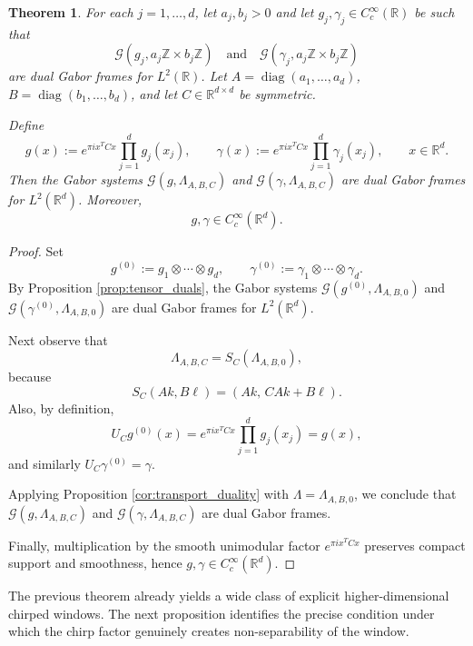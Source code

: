 \documentclass[final,1p,times,authoryear]{elsarticle}
\newtheorem{theorem}{Theorem}
\theoremstyle{definition}
\newcommand{\R}{\mathbb{R}}
\newcommand{\Z}{\mathbb{Z}}
\newcommand{\1}{\mathbf{1}}
\begin{document}
\begin{theorem}\label{thm:main_constructive}
For each $j=1,\dots,d$, let $a_j,b_j>0$ and let $g_j,\gamma_j\in C_c^\infty(\R)$ be such that
$$
\mathcal G(g_j,a_j\Z\times b_j\Z)
\quad\text{and}\quad
\mathcal G(\gamma_j,a_j\Z\times b_j\Z)
$$
are dual Gabor frames for $L^2(\R)$.
Let $A=\operatorname{diag}(a_1,\dots,a_d)$, $B=\operatorname{diag}(b_1,\dots,b_d)$,
and let $C\in \R^{d\times d}$ be symmetric.

Define
$$
g(x):=e^{\pi i x^TCx}\prod_{j=1}^d g_j(x_j),
\qquad
\gamma(x):=e^{\pi i x^TCx}\prod_{j=1}^d \gamma_j(x_j),
\qquad x\in\R^d.
$$
Then the Gabor systems $\mathcal G(g,\Lambda_{A,B,C})$ and
$\mathcal G(\gamma,\Lambda_{A,B,C})$ are dual Gabor frames for $L^2(\R^d)$.
Moreover,
$$
g,\gamma\in C_c^\infty(\R^d).
$$
\end{theorem}

\begin{proof}
Set
$$
g^{(0)}:=g_1\otimes\cdots\otimes g_d,
\qquad
\gamma^{(0)}:=\gamma_1\otimes\cdots\otimes \gamma_d.
$$
By Proposition \ref{prop:tensor_duals}, the Gabor systems
$\mathcal G(g^{(0)},\Lambda_{A,B,0})$ and $\mathcal G(\gamma^{(0)},\Lambda_{A,B,0})$
are dual Gabor frames for $L^2(\R^d)$.

Next observe that
$$
\Lambda_{A,B,C}=S_C(\Lambda_{A,B,0}),
$$
because
$$
S_C(Ak,B\ell)=(Ak,\,CAk+B\ell).
$$
Also, by definition,
$$
U_C g^{(0)}(x)=e^{\pi i x^TCx}\prod_{j=1}^d g_j(x_j)=g(x),
$$
and similarly $U_C \gamma^{(0)}=\gamma$.

Applying Proposition \ref{cor:transport_duality} with $\Lambda=\Lambda_{A,B,0}$,
we conclude that $\mathcal G(g,\Lambda_{A,B,C})$ and
$\mathcal G(\gamma,\Lambda_{A,B,C})$ are dual Gabor frames.

Finally, multiplication by the smooth unimodular factor $e^{\pi i x^TCx}$ preserves
compact support and smoothness, hence $g,\gamma\in C_c^\infty(\R^d)$.
\end{proof}

{The previous theorem already yields a wide class of explicit higher-dimensional chirped windows.
The next proposition identifies the precise condition under which the chirp factor genuinely creates
non-separability of the window.}
\end{document}
